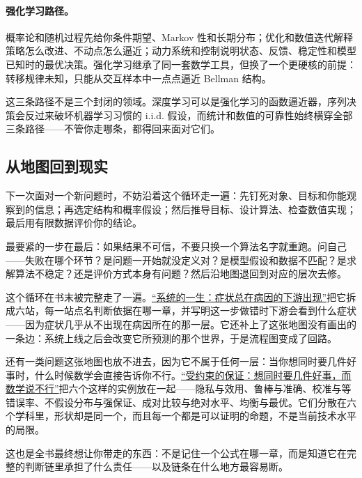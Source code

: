 \paragraph{强化学习路径。}
概率论和随机过程先给你条件期望、Markov 性和长期分布；优化和数值迭代解释策略怎么改进、不动点怎么逼近；动力系统和控制说明状态、反馈、稳定性和模型已知时的最优决策。强化学习继承了同一套数学工具，但换了一个更硬核的前提：转移规律未知，只能从交互样本中一点点逼近 Bellman 结构。

这三条路径不是三个封闭的领域。深度学习可以是强化学习的函数逼近器，序列决策会反过来破坏机器学习习惯的 i.i.d. 假设，而统计和数值的可靠性始终横穿全部三条路径——不管你走哪条，都得回来面对它们。

\subsection{从地图回到现实}

下一次面对一个新问题时，不妨沿着这个循环走一遍：先钉死对象、目标和你能观察到的信息；再选定结构和概率假设；然后推导目标、设计算法、检查数值实现；最后用有限数据评价你的结论。

最要紧的一步在最后：如果结果不可信，不要只换一个算法名字就重跑。问自己——失败在哪个环节？是问题一开始就没定义对？是模型假设和数据不匹配？是求解算法不稳定？还是评价方式本身有问题？然后沿地图退回到对应的层次去修。

这个循环在书末被完整走了一遍。\hyperref[ch:148]{``系统的一生：症状总在病因的下游出现''}把它拆成六站，每一站点名判断依据在哪一章，并写明这一步做错时下游会看到什么症状——因为症状几乎从不出现在病因所在的那一层。它还补上了这张地图没有画出的一条边：系统上线之后会改变它所预测的那个世界，于是流程图变成了回路。

还有一类问题这张地图也放不进去，因为它不属于任何一层：当你想同时要几件好事时，什么时候数学会直接告诉你不行。\hyperref[ch:140]{``受约束的保证：想同时要几件好事，而数学说不行''}把六个这样的实例放在一起——隐私与效用、鲁棒与准确、校准与等错误率、不假设分布与强保证、成对比较与绝对水平、均衡与最优。它们分散在六个学科里，形状却是同一个，而且每一个都是可以证明的命题，不是当前技术水平的局限。

这也是全书最终想让你带走的东西：不是记住一个公式在哪一章，而是知道它在完整的判断链里承担了什么责任——以及链条在什么地方最容易断。
